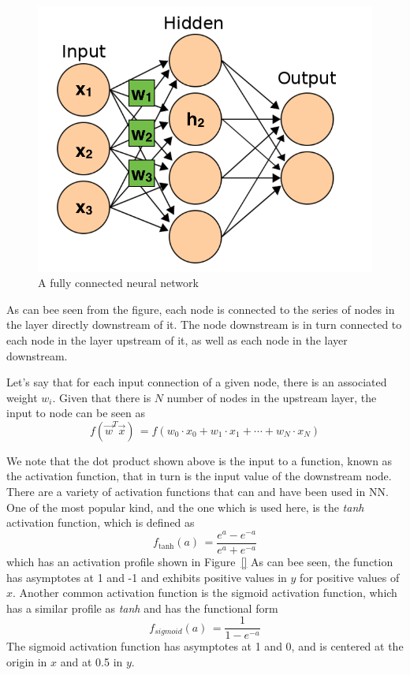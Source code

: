 \documentclass[letterpaper,12pt]{article}
\newcommand{\figref}[1]{Figure~\ref{#1}}
\begin{document}
\begin{figure}[htbp]
\begin{center}
\includegraphics[scale=0.5]{images/nn_edit.png}
\caption{A fully connected neural network \cite{ann}}
\label{conv}
\end{center}
\end{figure}

As can bee seen from the figure, each node is connected to the series of nodes in the layer directly downstream of it. The node downstream is in turn connected to each node in the layer upstream of it, as well as each node in the layer downstream.

Let's say that for each input connection of a given node, there is an associated weight $w_i$. Given that there is $N$ number of nodes in the upstream layer, the input to node can be seen as 
\begin{equation}
f(\vec{w}^T\vec{x}) \, = f(w_0 \cdot x_0 + w_1 \cdot x_1 + \cdots + w_N \cdot x_N)
\end{equation}

We note that the dot product shown above is the input to a function, known as the activation function, that in turn is the input value of the downstream node. There are a variety of activation functions that can and have been used in NN. One of the most popular kind, and the one which is used here, is the \textit{tanh} activation function, which is defined as
\begin{equation}
f_{\text{tanh}}(a) \, = \frac{e^a-e^{-a}}{e^a+e^{-a}}
\end{equation}
which has an activation profile shown in \figref{} As can bee seen, the function has asymptotes  at 1 and -1 and exhibits positive values in $y$ for positive values of $x$. Another common activation function is the sigmoid activation function, which has a similar profile as \textit{tanh} and has the functional form
\begin{equation}
f_{sigmoid}(a) \, = \frac{1}{1-e^{-a}}
\end{equation}
The sigmoid activation function has asymptotes at 1 and 0, and is centered at the origin in $x$ and at 0.5 in $y$. 
\end{document}
